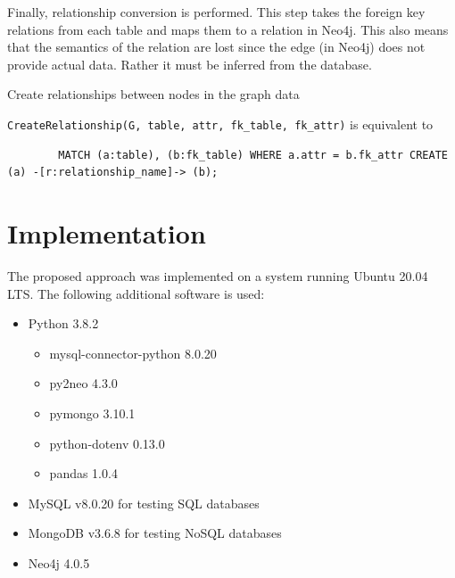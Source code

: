 \documentclass[12pt]{article}
\newcommand{\sectionfontstyle}{\fontsize{16pt}{1em}\usefont{T1}{phv}{b}{n}}
\begin{document}
    Finally, relationship conversion is performed. This step takes the foreign key relations from each table and maps them to a relation in Neo4j. This also means that the semantics of the relation are lost since the edge (in Neo4j) does not provide actual data. Rather it must be inferred from the database.

    \begin{algorithm}[htb!]
        \SetAlgoLined
        \label{algo:sql2rel}
        \caption{Create relationships between nodes in the graph data}
    \end{algorithm}

    \verb|CreateRelationship(G, table, attr, fk_table, fk_attr)| is equivalent to 
    \begin{lstlisting}
        MATCH (a:table), (b:fk_table) WHERE a.attr = b.fk_attr CREATE (a) -[r:relationship_name]-> (b);
    \end{lstlisting}

    \clearpage

    \section{\sectionfontstyle Implementation}
    \label{sec:impl}
    The proposed approach was implemented on a system running Ubuntu 20.04 LTS. The following additional software is used:
    \begin{itemize}
        \item Python 3.8.2
        \begin{itemize}
            \item mysql-connector-python 8.0.20
            \item py2neo 4.3.0
            \item pymongo 3.10.1
            \item python-dotenv 0.13.0
            \item pandas 1.0.4
        \end{itemize}
        \item MySQL v8.0.20 for testing SQL databases
        \item MongoDB v3.6.8 for testing NoSQL databases
        \item Neo4j 4.0.5
    \end{itemize}
\end{document}
